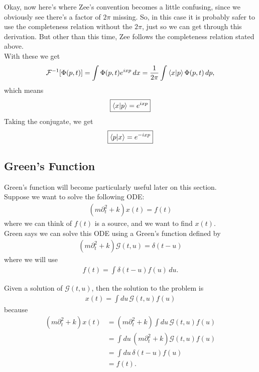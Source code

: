 \documentclass{book}
\theoremstyle{definition}
\newcommand{\p}{\partial}
\newcommand{\G}{\mathcal{G}}
\newcommand{\f}[2]{\frac{#1}{#2}}
\newcommand{\lp}{\left(}
\newcommand{\rp}{\right)}
\begin{document}
Okay, now here's where Zee's convention becomes a little confusing, since we obviously see there's a factor of $2\pi$ missing. So, in this case it is probably safer to use the completeness relation without the $2\pi$, just so we can get through this derivation. But other than this time, Zee follows the completeness relation stated above. \\

With these we get
\begin{align}
\mathcal{F}^{-1}[\Phi(p,t)] = \int \Phi(p,t)e^{ixp}\,dx = \f{1}{2\pi}\int \bra{x}\ket{p} \Phi(p,t)\,dp,
\end{align} 
which means
\begin{align}
\boxed{\braket{x}{p} = e^{ixp}}
\end{align}
Taking the conjugate, we get
\begin{align}
\boxed{\braket{p}{x} = e^{-ixp}}
\end{align}


\subsection{Green's Function}



Green's function will become particularly useful later on this section.\\

Suppose we want to solve the following ODE:
\begin{align}
\lp m \p_t^2 + k \rp x(t) = f(t)
\end{align}
where we can think of $f(t)$ is a source, and we want to find $x(t)$. \\

Green says we can solve this ODE using a Green's function defined by
\begin{align}
\lp m \p_t^2 + k \rp \G(t,u) = \delta(t - u)
\end{align}
where we will use
\begin{align}
f(t) = \int \delta(t-u) f(u)\,du.
\end{align}

Given a solution of $\G(t,u)$, then the solution to the problem is
\begin{align}
\boxed{x(t) = \int du\, \G(t,u)f(u)}
\end{align}
because
\begin{align}
\lp m \p_t^2 + k \rp x(t) &= \lp m \p_t^2 + k \rp \int du\, \G(t,u)f(u)\\
&= \int du\,  \lp m \p_t^2 + k \rp \G(t,u)f(u)\\
&= \int du\, \delta(t-u)f(u)\\
&= f(t).
\end{align}
\end{document}
